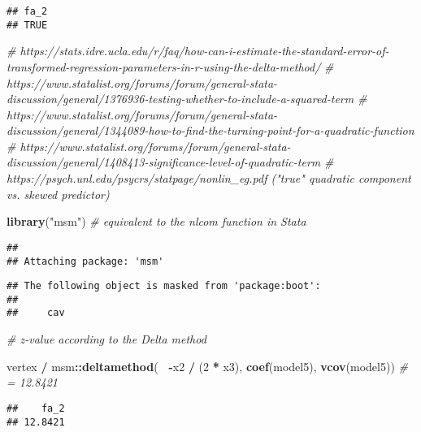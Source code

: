 \documentclass[
]{article}
\newenvironment{Shaded}{\begin{snugshade}}{\end{snugshade}}
\newcommand{\CommentTok}[1]{\textcolor[rgb]{0.56,0.35,0.01}{\textit{#1}}}
\newcommand{\DecValTok}[1]{\textcolor[rgb]{0.00,0.00,0.81}{#1}}
\newcommand{\KeywordTok}[1]{\textcolor[rgb]{0.13,0.29,0.53}{\textbf{#1}}}
\newcommand{\NormalTok}[1]{#1}
\newcommand{\OperatorTok}[1]{\textcolor[rgb]{0.81,0.36,0.00}{\textbf{#1}}}
\newcommand{\StringTok}[1]{\textcolor[rgb]{0.31,0.60,0.02}{#1}}
\begin{document}
\begin{verbatim}
## fa_2 
## TRUE
\end{verbatim}

\begin{Shaded}
\begin{Highlighting}[]
\CommentTok{# https://stats.idre.ucla.edu/r/faq/how-can-i-estimate-the-standard-error-of-transformed-regression-parameters-in-r-using-the-delta-method/}
\CommentTok{# https://www.statalist.org/forums/forum/general-stata-discussion/general/1376936-testing-whether-to-include-a-squared-term}
\CommentTok{# https://www.statalist.org/forums/forum/general-stata-discussion/general/1344089-how-to-find-the-turning-point-for-a-quadratic-function}
\CommentTok{# https://www.statalist.org/forums/forum/general-stata-discussion/general/1408413-significance-level-of-quadratic-term}
\CommentTok{# https://psych.unl.edu/psycrs/statpage/nonlin_eg.pdf ("true" quadratic component vs. skewed predictor)}


\KeywordTok{library}\NormalTok{(}\StringTok{"msm"}\NormalTok{) }\CommentTok{# equivalent to the nlcom function in Stata}
\end{Highlighting}
\end{Shaded}

\begin{verbatim}
## 
## Attaching package: 'msm'
\end{verbatim}

\begin{verbatim}
## The following object is masked from 'package:boot':
## 
##     cav
\end{verbatim}

\begin{Shaded}
\begin{Highlighting}[]
\CommentTok{# z-value according to the Delta method}

\NormalTok{vertex }\OperatorTok{/}\StringTok{ }\NormalTok{msm}\OperatorTok{::}\KeywordTok{deltamethod}\NormalTok{(}\OperatorTok{~}\StringTok{ }\OperatorTok{-}\NormalTok{x2 }\OperatorTok{/}\StringTok{ }\NormalTok{(}\DecValTok{2} \OperatorTok{*}\StringTok{ }\NormalTok{x3), }\KeywordTok{coef}\NormalTok{(model5), }\KeywordTok{vcov}\NormalTok{(model5)) }\CommentTok{# = 12.8421}
\end{Highlighting}
\end{Shaded}

\begin{verbatim}
##    fa_2 
## 12.8421
\end{verbatim}
\end{document}
